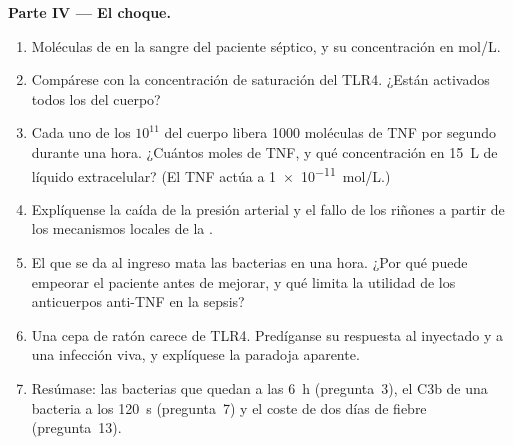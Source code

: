\begin{problem}
\medskip
\noindent\textbf{Parte IV --- El choque.}
\begin{enumerate}[resume]
  \item Moléculas de  en la sangre del paciente séptico,
        y su concentración en mol/L.
  \item Compárese con la concentración de saturación del TLR4. ¿Están
        activados todos los  del cuerpo?
  \item Cada uno de los $10^{11}$  del cuerpo libera \num{1000}
        moléculas de TNF por segundo durante una hora. ¿Cuántos moles de
        TNF, y qué concentración en \qty{15}{L} de líquido extracelular?
        (El TNF actúa a \qty{1e-11}{mol/L}.)
  \item Explíquense la caída de la presión arterial y el fallo de los
        riñones a partir de los mecanismos locales de la .
  \item El  que se da al ingreso mata las bacterias en una
        hora. ¿Por qué puede empeorar el paciente antes de mejorar, y qué
        limita la utilidad de los anticuerpos anti-TNF en la sepsis?
  \item Una cepa de ratón carece de TLR4. Predíganse su respuesta al
         inyectado y a una infección  viva, y
        explíquese la paradoja aparente.
  \item Resúmase: las bacterias que quedan a las \qty{6}{h}
        (pregunta~3), el C3b de una bacteria a los \qty{120}{s}
        (pregunta~7) y el coste de dos días de fiebre (pregunta~13).
\end{enumerate}
\end{problem}
